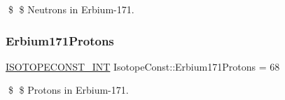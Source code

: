\$ \$ Neutrons in Erbium-\/171. \mbox{\label{group___isotope_const-_erbium-_er171_ga3f9defc54c621e8f279dd72a15ee2344}} 
\subsubsection{\texorpdfstring{Erbium171\+Protons}{Erbium171Protons}}
{\footnotesize\ttfamily \mbox{\hyperlink{group___isotope_const-_macros_ga5f18360b3e99483a35c32d789e62621c}{I\+S\+O\+T\+O\+P\+E\+C\+O\+N\+S\+T\+\_\+\+I\+NT}} Isotope\+Const\+::\+Erbium171\+Protons = 68}

\$ \$ Protons in Erbium-\/171. 